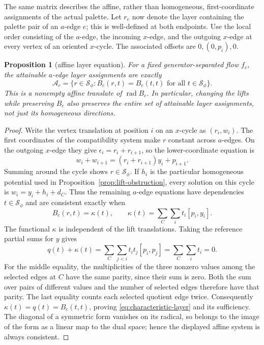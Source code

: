 \documentclass[11pt,a4paper]{article}
\newtheorem{proposition}[theorem]{Proposition}
\theoremstyle{definition}
\theoremstyle{remark}
\begin{document}
The same matrix describes the affine, rather than homogeneous, first-coordinate assignments of the actual palette.  Let $r_e$ now denote the layer containing the palette pair of an $a$-edge $e$; this is well-defined at both endpoints.  Use the local order consisting of the $a$-edge, the incoming $x$-edge, and the outgoing $x$-edge at every vertex of an oriented $x$-cycle.  The associated offsets are $0,(0,p_i),0$.

\begin{proposition}[affine layer equation]\label{prop:affine-layer}
For a fixed generator-separated flow $f_c$, the attainable $a$-edge layer assignments are exactly
\begin{equation}\label{eq:characteristic-layer}
 \mathcal A_c=\{r\in\mathcal S_\phi:
 B_c(r,t)=B_c(t,t)\text{ for all }t\in\mathcal S_\phi\}.
\end{equation}
This is a nonempty affine translate of $\operatorname{rad} B_c$.  In particular, changing the lifts while preserving $B_c$ also preserves the entire set of attainable layer assignments, not just its homogeneous directions.
\end{proposition}
\begin{proof}
Write the vertex translation at position $i$ on an $x$-cycle as $(r_i,w_i)$.  The first coordinates of the compatibility system make $r$ constant across $a$-edges.  On the outgoing $x$-edge they give $\epsilon_i=r_i+r_{i+1}$, so the lower-coordinate equation is
\[
 w_i+w_{i+1}=(r_i+r_{i+1})y_i+p_{i+1}.
\]
Summing around the cycle shows $r\in\mathcal S_\phi$.  If $h_i$ is the particular homogeneous potential used in Proposition~\ref{prop:lift-obstruction}, every solution on this cycle is $w_i=y_i+h_i+d_C$.  Thus the remaining $a$-edge equations have dependencies $t\in\mathcal S_\phi$ and are consistent exactly when
\[
 B_c(r,t)=\kappa(t),\qquad
 \kappa(t)=\sum_C\sum_i t_i[p_i,y_i].
\]
The functional $\kappa$ is independent of the lift translations.  Taking the reference partial sums for $y$ gives
\[
 q(t)+\kappa(t)
 =\sum_C\sum_{j<i}t_i t_j[p_i,p_j]
 =\sum_C\sum_i t_i=0.
\]
For the middle equality, the multiplicities of the three nonzero values among the selected edges at $C$ have the same parity, since their sum is zero.  Both the sum over pairs of different values and the number of selected edges therefore have that parity.  The last equality counts each selected quotient edge twice.  Consequently $\kappa(t)=q(t)=B_c(t,t)$, proving \eqref{eq:characteristic-layer} and its sufficiency.  The diagonal of a symmetric form vanishes on its radical, so belongs to the image of the form as a linear map to the dual space; hence the displayed affine system is always consistent.
\end{proof}
\end{document}
